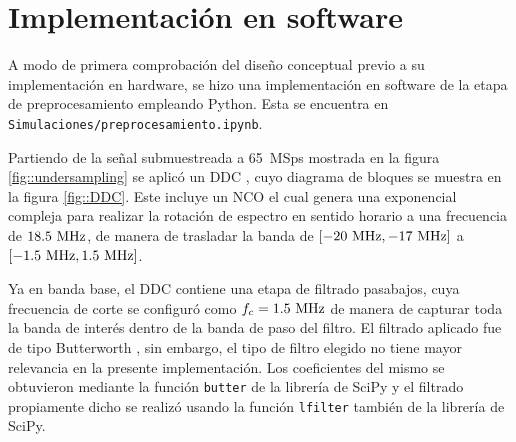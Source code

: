 \documentclass[../../main.tex]{subfiles}
\begin{document}



\section{Implementación en software}
A modo de primera comprobación del diseño conceptual previo a su implementación en hardware, se hizo una implementación en software  de la etapa de preprocesamiento empleando Python. 
Esta se encuentra en \texttt{Simulaciones/preprocesamiento.ipynb}. 

Partiendo de la señal submuestreada a 65~MSps mostrada en la figura \ref{fig::undersampling} se aplicó un DDC \cite{DDC}, cuyo diagrama de bloques se muestra en la figura \ref{fig::DDC}. 
Este incluye un NCO el cual genera una exponencial compleja para realizar la rotación de espectro en sentido horario a una frecuencia de $18.5~\textrm{MHz}$, de manera de trasladar la banda de $[-20~\textrm{MHz}, -17~\textrm{MHz}]$ a $[-1.5~\textrm{MHz}, 1.5~\textrm{MHz}]$. 

Ya en banda base, el DDC contiene una etapa de filtrado pasabajos, cuya frecuencia de corte se configuró como $f_c = 1.5~\textrm{MHz}$ de manera de capturar toda la banda de interés dentro de la banda de paso del filtro. El filtrado aplicado fue de tipo Butterworth \cite{Butterworth}, sin embargo, el tipo de filtro elegido no tiene mayor relevancia en la presente implementación. Los coeficientes del mismo se obtuvieron mediante la función \texttt{butter} \cite{butter} de la librería de SciPy \cite{scipy} y el filtrado propiamente dicho se realizó usando la función \texttt{lfilter} \cite{lfilter} también de la librería de SciPy. 
\end{document}
